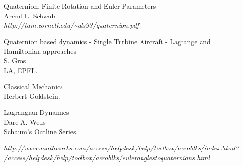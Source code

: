 \documentclass{article}
\begin{document}
%

\begin{thebibliography}{9}

	Quaternion, Finite Rotation and Euler Parameters\\
	Arend L. Schwab \\
	\emph{http://tam.cornell.edu/\~{}als93/quaternion.pdf}
	
	Quaternion based dynamics - Single Turbine Aircraft - Lagrange and Hamiltonian approaches \\
	S. Gros\\
	LA, EPFL.
		
	Classical Mechanics \\
	Herbert Goldstein.
	
	Lagrangian Dynamics \\
	Dare A. Wells \\
	Schaum's Outline Series.
	
	
	
	\emph{http://www.mathworks.com/access/helpdesk/help/toolbox/aeroblks/index.html?}\\
         \emph{ /access/helpdesk/help/toolbox/aeroblks/euleranglestoquaternions.html}
	
	
	


	
\end{thebibliography}
\end{document}
